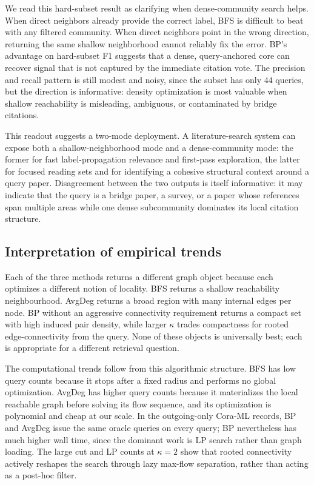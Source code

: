 \documentclass[12pt]{article}
\begin{document}


We read this hard-subset result as clarifying when dense-community search helps.  When direct neighbors already provide the correct label, BFS is difficult to beat with any filtered community.  When direct neighbors point in the wrong direction, returning the same shallow neighborhood cannot reliably fix the error.  BP's advantage on hard-subset F1 suggests that a dense, query-anchored core can recover signal that is not captured by the immediate citation vote.  The precision and recall pattern is still modest and noisy, since the subset has only $44$ queries, but the direction is informative: density optimization is most valuable when shallow reachability is misleading, ambiguous, or contaminated by bridge citations.

This readout suggests a two-mode deployment.  A literature-search system can expose both a shallow-neighborhood mode and a dense-community mode: the former for fast label-propagation relevance and first-pass exploration, the latter for focused reading sets and for identifying a cohesive structural context around a query paper.  Disagreement between the two outputs is itself informative: it may indicate that the query is a bridge paper, a survey, or a paper whose references span multiple areas while one dense subcommunity dominates its local citation structure.

\subsection{Interpretation of empirical trends}
\label{subsec:results-discussion}

Each of the three methods returns a different graph object because each optimizes a different notion of locality.  BFS returns a shallow reachability neighbourhood.  AvgDeg returns a broad region with many internal edges per node.  BP without an aggressive connectivity requirement returns a compact set with high induced pair density, while larger $\kappa$ trades compactness for rooted edge-connectivity from the query.  None of these objects is universally best; each is appropriate for a different retrieval question.

The computational trends follow from this algorithmic structure.  BFS has low query counts because it stops after a fixed radius and performs no global optimization.  AvgDeg has higher query counts because it materializes the local reachable graph before solving its flow sequence, and its optimization is polynomial and cheap at our scale.  In the outgoing-only Cora-ML records, BP and AvgDeg issue the same oracle queries on every query; BP nevertheless has much higher wall time, since the dominant work is LP search rather than graph loading.  The large cut and LP counts at $\kappa=2$ show that rooted connectivity actively reshapes the search through lazy max-flow separation, rather than acting as a post-hoc filter.
\end{document}
